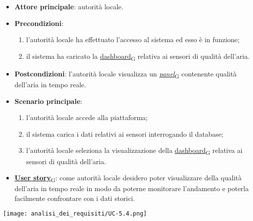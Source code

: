 \begin{itemize}
	\item \textbf{Attore principale}: autorità locale.
	\item \textbf{Precondizioni}:
	      \begin{enumerate}
		      \item l'autorità locale ha effettuato l'accesso al sistema ed esso è in funzione;
		      \item il sistema ha caricato la \href{https://7last.github.io/docs/pb/documentazione-interna/glossario\#dashboard}{dashboard\textsubscript{G}} relativa ai sensori di qualità dell'aria.
	      \end{enumerate}
	\item \textbf{Postcondizioni}: l'autorità locale visualizza un \href{https://7last.github.io/docs/pb/documentazione-interna/glossario\#panel}{\textit{panel}\textsubscript{G}} contenente qualità dell'aria in tempo reale.
	\item \textbf{Scenario principale}:
	      \begin{enumerate}
		      \item l'autorità locale accede alla piattaforma;
		      \item il sistema carica i dati relativi ai sensori interrogando il database;
		      \item l'autorità locale seleziona la visualizzazione della \href{https://7last.github.io/docs/pb/documentazione-interna/glossario\#dashboard}{dashboard\textsubscript{G}} relativa ai sensori di qualità dell'aria.
	      \end{enumerate}
	\item \href{https://7last.github.io/docs/pb/documentazione-interna/glossario\#user-story}{\textbf{User story}\textsubscript{G}}:
	      come autorità locale desidero poter visualizzare della qualità dell'aria in tempo reale in modo da poterne monitorare l'andamento
	      e poterla facilmente confrontare con i dati storici.
\end{itemize}
\begin{center}
	\texttt{[image: analisi\_dei\_requisiti/UC-5.4.png]}
\end{center}

